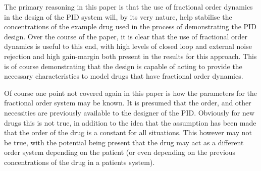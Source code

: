 The primary reasoning in this paper is that the use of fractional order dynamics in the design of the PID system will, by its very nature, help stabilise the concentrations of the example drug used in the process of demonstrating the PID design. Over the course of the paper, it is clear that the use of fractional order dynamics is useful to this end, with high levels of closed loop and external noise rejection and high gain-margin both present in the results for this approach. This is of course demonstrating that the design is capable of acting to provide the necessary characteristics to model drugs that have fractional order dynamics.

Of course one point not covered again in this paper is how the parameters for the fractional order system may be known. It is presumed that the order, and other necessities are previously available to the designer of the PID. Obviously for new drugs this is not true, in addition to the idea that the assumption has been made that the order of the drug is a constant for all situations. This however may not be true, with the potential being present that the drug may act as a different order system depending on the patient (or even depending on the previous concentrations of the drug in a patients system). 
